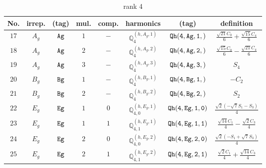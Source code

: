 \documentclass[fleqn,8pt]{jsarticle}
\begin{document}
\begin{table}[ht!]
\begin{center}
\caption{rank 4}
\renewcommand{\arraystretch}{1.3}
\begin{tabular}{cccccccc} \hline \hline
No. & irrep. & (tag) & mul. & comp. & harmonics & (tag) & definition \\ \hline
$ 17 $ & $ A_{g} $ & $ {\tt Ag} $ & $ 1 $ & $ - $ & $ \mathbb{Q}_{4}^{(h,A_{g},1)} $ & $ {\tt Qh(4,Ag,1,)} $ & $ \frac{\sqrt{21} C_{0}}{6} + \frac{\sqrt{15} C_{4}}{6} $ \\
$ 18 $ & $ A_{g} $ & $ {\tt Ag} $ & $ 2 $ & $ - $ & $ \mathbb{Q}_{4}^{(h,A_{g},2)} $ & $ {\tt Qh(4,Ag,2,)} $ & $ \frac{\sqrt{15} C_{0}}{6} - \frac{\sqrt{21} C_{4}}{6} $ \\
$ 19 $ & $ A_{g} $ & $ {\tt Ag} $ & $ 3 $ & $ - $ & $ \mathbb{Q}_{4}^{(h,A_{g},3)} $ & $ {\tt Qh(4,Ag,3,)} $ & $ S_{4} $ \\
$ 20 $ & $ B_{g} $ & $ {\tt Bg} $ & $ 1 $ & $ - $ & $ \mathbb{Q}_{4}^{(h,B_{g},1)} $ & $ {\tt Qh(4,Bg,1,)} $ & $ - C_{2} $ \\
$ 21 $ & $ B_{g} $ & $ {\tt Bg} $ & $ 2 $ & $ - $ & $ \mathbb{Q}_{4}^{(h,B_{g},2)} $ & $ {\tt Qh(4,Bg,2,)} $ & $ S_{2} $ \\
$ 22 $ & $ E_{g} $ & $ {\tt Eg} $ & $ 1 $ & $ 0 $ & $ \mathbb{Q}_{4,0}^{(h,E_{g},1)} $ & $ {\tt Qh(4,Eg,1,0)} $ & $ \frac{\sqrt{2} \left(- \sqrt{7} S_{1} - S_{3}\right)}{4} $ \\
$ 23 $ & $ E_{g} $ & $ {\tt Eg} $ & $ 1 $ & $ 1 $ & $ \mathbb{Q}_{4,1}^{(h,E_{g},1)} $ & $ {\tt Qh(4,Eg,1,1)} $ & $ \frac{\sqrt{14} C_{1}}{4} - \frac{\sqrt{2} C_{3}}{4} $ \\
$ 24 $ & $ E_{g} $ & $ {\tt Eg} $ & $ 2 $ & $ 0 $ & $ \mathbb{Q}_{4,0}^{(h,E_{g},2)} $ & $ {\tt Qh(4,Eg,2,0)} $ & $ \frac{\sqrt{2} \left(- S_{1} + \sqrt{7} S_{3}\right)}{4} $ \\
$ 25 $ & $ E_{g} $ & $ {\tt Eg} $ & $ 2 $ & $ 1 $ & $ \mathbb{Q}_{4,1}^{(h,E_{g},2)} $ & $ {\tt Qh(4,Eg,2,1)} $ & $ \frac{\sqrt{2} C_{1}}{4} + \frac{\sqrt{14} C_{3}}{4} $ \\
 \hline \hline
\end{tabular}
\end{center}
\end{table}
\end{document}
